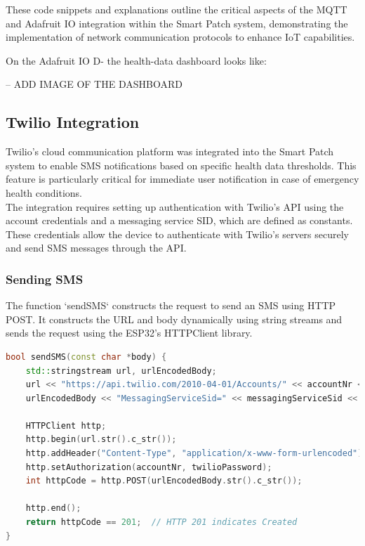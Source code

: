 \noindent These code snippets and explanations outline the critical aspects of the MQTT and Adafruit IO integration within the Smart Patch system, demonstrating the implementation of network communication protocols to enhance IoT capabilities.

On the Adafruit IO D- the health-data dashboard looks like:

-- ADD IMAGE OF THE DASHBOARD


\subsection{Twilio Integration}

Twilio's cloud communication platform was integrated into the Smart Patch system to enable SMS notifications based on specific health data thresholds. This feature is particularly critical for immediate user notification in case of emergency health conditions. \\

\noindent The integration requires setting up authentication with Twilio's API using the account credentials and a messaging service SID, which are defined as constants. These credentials allow the device to authenticate with Twilio's servers securely and send SMS messages through the API.

\subsubsection{Sending SMS}

The function `sendSMS` constructs the request to send an SMS using HTTP POST. It constructs the URL and body dynamically using string streams and sends the request using the ESP32's HTTPClient library.

\begin{lstlisting}[language=C++, caption={Function to Send SMS via Twilio}]
bool sendSMS(const char *body) {
    std::stringstream url, urlEncodedBody;
    url << "https://api.twilio.com/2010-04-01/Accounts/" << accountNr << "/Messages";
    urlEncodedBody << "MessagingServiceSid=" << messagingServiceSid << "&To=" << to.c_str() << "&Body=" << body;

    HTTPClient http;
    http.begin(url.str().c_str());
    http.addHeader("Content-Type", "application/x-www-form-urlencoded");
    http.setAuthorization(accountNr, twilioPassword);
    int httpCode = http.POST(urlEncodedBody.str().c_str());

    http.end();
    return httpCode == 201;  // HTTP 201 indicates Created
}
\end{lstlisting}

